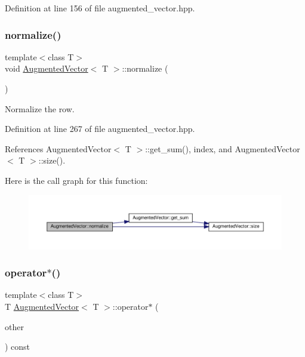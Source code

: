 Definition at line 156 of file augmented\+\_\+vector.\+hpp.

\mbox{\label{classAugmentedVector_a55477c79ed6d790255a44634c18d9e61}} 
\subsubsection{\texorpdfstring{normalize()}{normalize()}}
{\footnotesize\ttfamily template$<$class T$>$ \\
void \hyperlink{classAugmentedVector}{Augmented\+Vector}$<$ T $>$\+::normalize (\begin{DoxyParamCaption}{ }\end{DoxyParamCaption})\hspace{0.3cm}{\ttfamily [inline]}}



Normalize the row. 



Definition at line 267 of file augmented\+\_\+vector.\+hpp.



References Augmented\+Vector$<$ T $>$\+::get\+\_\+sum(), index, and Augmented\+Vector$<$ T $>$\+::size().

Here is the call graph for this function\+:
\nopagebreak
\begin{figure}[H]
\begin{center}
\leavevmode
\includegraphics[width=350pt]{d1/d7a/classAugmentedVector_a55477c79ed6d790255a44634c18d9e61_cgraph}
\end{center}
\end{figure}
\mbox{\label{classAugmentedVector_a6be307e136294e678924bf96991ec91c}} 
\subsubsection{\texorpdfstring{operator$\ast$()}{operator*()}}
{\footnotesize\ttfamily template$<$class T$>$ \\
T \hyperlink{classAugmentedVector}{Augmented\+Vector}$<$ T $>$\+::operator$\ast$ (\begin{DoxyParamCaption}\item[{const \hyperlink{classAugmentedVector}{Augmented\+Vector}$<$ T $>$ \&}]{other }\end{DoxyParamCaption}) const\hspace{0.3cm}{\ttfamily [inline]}}



